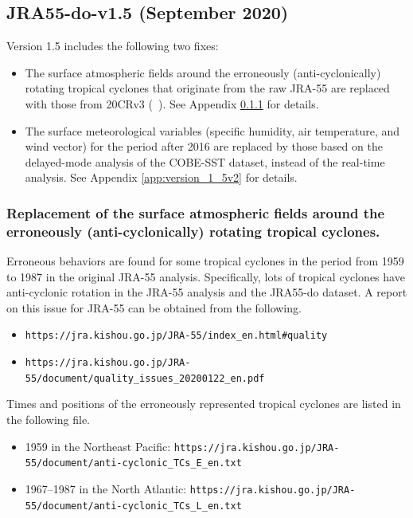 \documentclass[dvipdfmx]{elsarticle_mod}
\begin{document}
\subsection{JRA55-do-v1.5 (September 2020)}

\label{app:version_1_5}

Version 1.5 includes the following two fixes:
\begin{itemize}
 \item The surface atmospheric fields around the erroneously (anti-cyclonically) rotating tropical cyclones that originate from the raw JRA-55 are replaced with those from 20CRv3 (\citeauthor{Slivinski_et_al_2019}~\citeyear{Slivinski_et_al_2019}). See Appendix \ref{app:version_1_5v1} for details.
 \item The surface meteorological variables (specific humidity, air temperature, and wind vector) for the period after 2016 are replaced by those based on the delayed-mode analysis of the COBE-SST dataset, instead of the real-time analysis. See Appendix \ref{app:version_1_5v2} for details.
\end{itemize}

\subsubsection{Replacement of the surface atmospheric fields around the erroneously (anti-cyclonically) rotating tropical cyclones.}
\label{app:version_1_5v1}

Erroneous behaviors are found for some tropical cyclones in the period from 1959 to 1987 in the original JRA-55 analysis. Specifically, lots of tropical cyclones have anti-cyclonic rotation in the JRA-55 analysis and the JRA55-do dataset. A report on this issue for JRA-55 can be obtained from the following.
\begin{itemize}
  \item \texttt{https://jra.kishou.go.jp/JRA-55/index\_en.html\#quality}
  \item \texttt{https://jra.kishou.go.jp/JRA-55/document/quality\_issues\_20200122\_en.pdf}
\end{itemize}

Times and positions of the erroneously represented tropical cyclones are listed in the following file.
\begin{itemize}
  \item 1959 in the Northeast Pacific: \texttt{https://jra.kishou.go.jp/JRA-55/document/anti-cyclonic\_TCs\_E\_en.txt}
  \item 1967--1987 in the North Atlantic: \texttt{https://jra.kishou.go.jp/JRA-55/document/anti-cyclonic\_TCs\_L\_en.txt}
\end{itemize}
\end{document}
